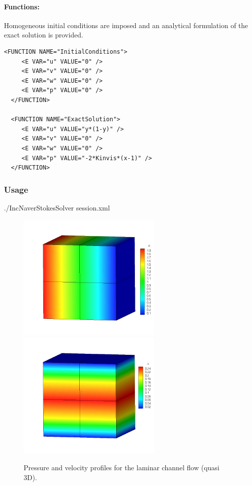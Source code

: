 \paragraph{Functions:~} Homogeneous initial conditions are imposed and an analytical formulation of the exact solution is provided.
\begin{lstlisting}[style=XMLStyle]
  <FUNCTION NAME="InitialConditions">
     <E VAR="u" VALUE="0" />
     <E VAR="v" VALUE="0" />
     <E VAR="w" VALUE="0" />
     <E VAR="p" VALUE="0" />
  </FUNCTION>

  <FUNCTION NAME="ExactSolution">
     <E VAR="u" VALUE="y*(1-y)" />
     <E VAR="v" VALUE="0" />
     <E VAR="w" VALUE="0" />
     <E VAR="p" VALUE="-2*Kinvis*(x-1)" />
  </FUNCTION>
\end{lstlisting}

\subsubsection{Usage}
./IncNaverStokesSolver session.xml

\begin{figure}
\begin{center}
\includegraphics[width=7cm]{Figures/CF3DCVP3PR.png}
\includegraphics[width=7cm]{Figures/CF3DCVP3.png}
\caption{Pressure and velocity profiles for the laminar channel flow (quasi 3D).}
\end{center}
\end{figure}


